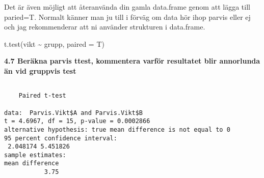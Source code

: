 \documentclass[
  letterpaper,
  DIV=11,
  numbers=noendperiod]{scrartcl}
\newenvironment{Shaded}{\begin{snugshade}}{\end{snugshade}}
\newcommand{\AttributeTok}[1]{\textcolor[rgb]{0.40,0.45,0.13}{#1}}
\newcommand{\CommentTok}[1]{\textcolor[rgb]{0.37,0.37,0.37}{#1}}
\newcommand{\ConstantTok}[1]{\textcolor[rgb]{0.56,0.35,0.01}{#1}}
\newcommand{\ControlFlowTok}[1]{\textcolor[rgb]{0.00,0.23,0.31}{\textbf{#1}}}
\newcommand{\DecValTok}[1]{\textcolor[rgb]{0.68,0.00,0.00}{#1}}
\newcommand{\FloatTok}[1]{\textcolor[rgb]{0.68,0.00,0.00}{#1}}
\newcommand{\FunctionTok}[1]{\textcolor[rgb]{0.28,0.35,0.67}{#1}}
\newcommand{\NormalTok}[1]{\textcolor[rgb]{0.00,0.23,0.31}{#1}}
\newcommand{\OtherTok}[1]{\textcolor[rgb]{0.00,0.23,0.31}{#1}}
\newcommand{\SpecialCharTok}[1]{\textcolor[rgb]{0.37,0.37,0.37}{#1}}
\newcommand{\StringTok}[1]{\textcolor[rgb]{0.13,0.47,0.30}{#1}}
\begin{document}
Det är även möjligt att återanvända din gamla data.frame genom att lägga
till paried=T. Normalt känner man ju till i förväg om data hör ihop
parvis eller ej och jag rekommenderar att ni använder strukturen i
data.frame.

t.test(vikt \textasciitilde{} grupp, paired = T)

\textbf{4.7 Beräkna parvis ttest, kommentera varför resultatet blir
annorlunda än vid gruppvis test}

\begin{Shaded}
\end{Shaded}

\begin{verbatim}

    Paired t-test

data:  Parvis.Vikt$A and Parvis.Vikt$B
t = 4.6967, df = 15, p-value = 0.0002866
alternative hypothesis: true mean difference is not equal to 0
95 percent confidence interval:
 2.048174 5.451826
sample estimates:
mean difference 
           3.75 
\end{verbatim}

\begin{Shaded}
\end{Shaded}
\end{document}
